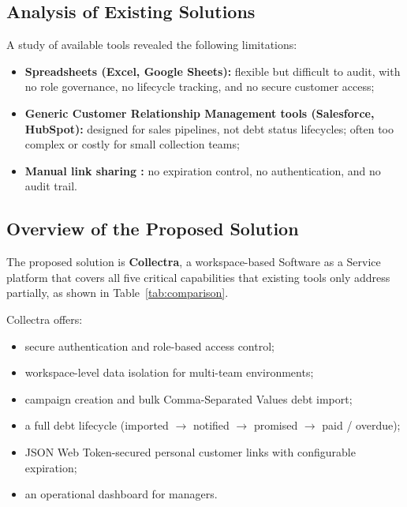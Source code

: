 \documentclass[12pt,a4paper]{report}
\begin{document}
\subsection{Analysis of Existing Solutions}

A study of available tools revealed the following limitations:
\begin{itemize}
  \item \textbf{Spreadsheets (Excel, Google Sheets):} flexible but difficult to audit,
        with no role governance, no lifecycle tracking, and no secure customer access;
  \item \textbf{Generic Customer Relationship Management tools (Salesforce, HubSpot):} designed for sales pipelines,
        not debt status lifecycles; often too complex or costly for small collection teams;
  \item \textbf{Manual link sharing :} no expiration control,
        no authentication, and no audit trail.
\end{itemize}

\subsection{Overview of the Proposed Solution}

The proposed solution is \textbf{Collectra}, a workspace-based Software as a Service platform that
covers all five critical capabilities that existing tools only address partially,
as shown in Table~\ref{tab:comparison}.

Collectra offers:
\begin{itemize}
  \item secure authentication and role-based access control;
  \item workspace-level data isolation for multi-team environments;
  \item campaign creation and bulk Comma-Separated Values debt import;
  \item a full debt lifecycle (imported $\to$ notified $\to$ promised $\to$ paid / overdue);
  \item JSON Web Token-secured personal customer links with configurable expiration;
  \item an operational dashboard for managers.
\end{itemize}
\end{document}
